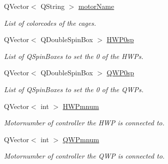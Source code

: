 \begin{DoxyCompactItemize}
\mbox{\label{classcagecontrol_a8e87cb65e7cd3b01bb35709ee62e5226}} 
Q\+Vector$<$ Q\+String $>$ \hyperlink{classcagecontrol_a8e87cb65e7cd3b01bb35709ee62e5226}{motor\+Name}
\begin{DoxyCompactList}\small\item\em List of colorcodes of the cages. \end{DoxyCompactList}\item 
\mbox{\label{classcagecontrol_a5af27745d1d9e0b9411d8445f5648e74}} 
Q\+Vector$<$ Q\+Double\+Spin\+Box $>$ \hyperlink{classcagecontrol_a5af27745d1d9e0b9411d8445f5648e74}{H\+W\+P0sp}
\begin{DoxyCompactList}\small\item\em List of Q\+Spin\+Boxes to set the \textquotesingle{}0\textquotesingle{} of the H\+W\+Ps. \end{DoxyCompactList}\item 
\mbox{\label{classcagecontrol_a026cbda0584d3b18cab5c30fec167ce2}} 
Q\+Vector$<$ Q\+Double\+Spin\+Box $>$ \hyperlink{classcagecontrol_a026cbda0584d3b18cab5c30fec167ce2}{Q\+W\+P0sp}
\begin{DoxyCompactList}\small\item\em List of Q\+Spin\+Boxes to set the \textquotesingle{}0\textquotesingle{} of the Q\+W\+Ps. \end{DoxyCompactList}\item 
\mbox{\label{classcagecontrol_a2ed383394220bea867589a6e7939156f}} 
Q\+Vector$<$ int $>$ \hyperlink{classcagecontrol_a2ed383394220bea867589a6e7939156f}{H\+W\+Pmnum}
\begin{DoxyCompactList}\small\item\em Motornumber of controller the H\+WP is connected to. \end{DoxyCompactList}\item 
\mbox{\label{classcagecontrol_a0ecfc817dfe853a073e6b11b3ac9c53c}} 
Q\+Vector$<$ int $>$ \hyperlink{classcagecontrol_a0ecfc817dfe853a073e6b11b3ac9c53c}{Q\+W\+Pmnum}
\begin{DoxyCompactList}\small\item\em Motornumber of controller the Q\+WP is connected to. \end{DoxyCompactList}\item 

\end{DoxyCompactItemize}
